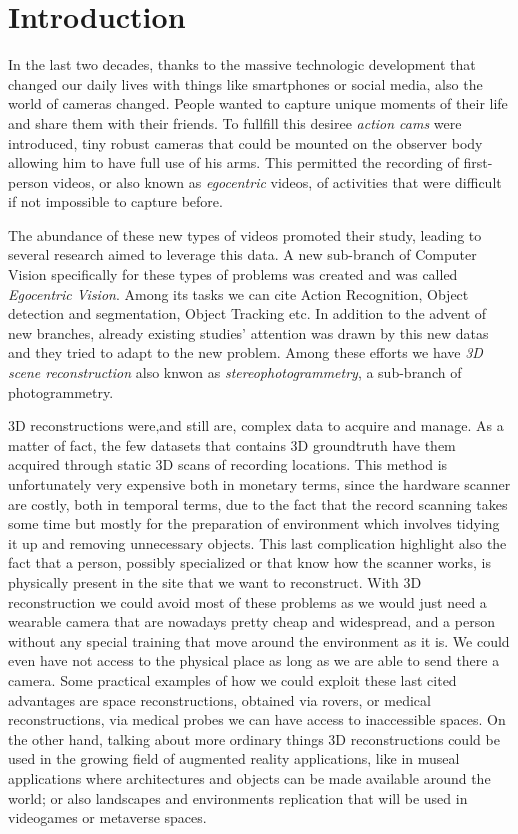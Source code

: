 \chapter*{Introduction}
In the last two decades, thanks to the massive technologic development that changed our daily lives
with things like smartphones or social media, also the world of cameras changed. People wanted to 
capture unique moments of their life and share them with their friends. To fullfill this desiree
\textit{action cams} were introduced, tiny robust cameras that could be mounted on the observer 
body allowing him to have full use of his arms. This permitted the recording of first-person videos,
or also known as \textit{egocentric} videos, of activities that were  difficult if not impossible to 
capture before.

The abundance of these new types of videos promoted their study, leading to several research aimed 
to leverage this data. A new sub-branch of Computer Vision specifically for 
these types of problems was created and was called \textit{Egocentric Vision}. Among its tasks we can cite
Action Recognition, Object detection and segmentation, Object Tracking etc. In addition to the advent of new branches,
already existing studies' attention was drawn by this new datas and they tried to adapt to the new problem. Among these efforts
we have\textit{ 3D scene reconstruction} also knwon as \textit{stereophotogrammetry}, a sub-branch of photogrammetry.

3D reconstructions were,and still are, complex data to acquire and manage. As a matter of fact, the few datasets
that contains 3D groundtruth have them acquired through static 3D scans of recording locations. This method is 
unfortunately very expensive both in monetary terms, since the hardware scanner are costly, both in temporal terms,
due to the fact that the record scanning takes some time but mostly for the preparation of environment which involves
tidying it up and removing unnecessary objects. This last complication highlight also the fact that a person, possibly
specialized or that know how the scanner works, is physically present in the site that we want to reconstruct.
With 3D reconstruction we could avoid most of these problems as we would just need a wearable camera that are nowadays
pretty cheap and widespread, and a person without any special training that move around
the environment as it is. We could even have not access to the physical place as long as we are able to send there a 
camera. Some practical examples of how we could exploit these last cited advantages are space reconstructions, obtained via rovers, or
medical reconstructions, via medical probes we can have access to inaccessible spaces. On the other hand, talking about more ordinary things
3D reconstructions could be used in the growing field of augmented reality applications, like in museal applications where architectures and 
objects can be made available around the world; or also landscapes and environments replication that will be used in videogames or metaverse spaces.



